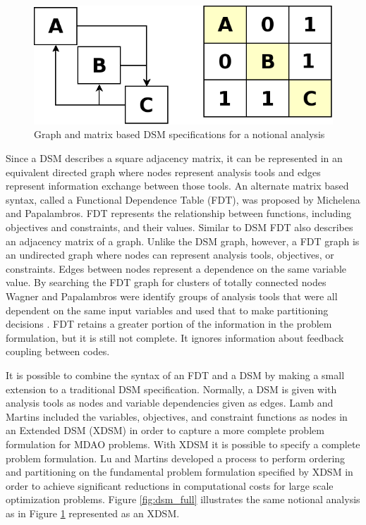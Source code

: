     \begin{figure}[!hbp]
        \begin{center}
        \includegraphics[width=.75\textwidth]{images/dsm_simple}
        \caption{Graph and matrix based DSM specifications for a notional analysis \label{fig:dsm_simple}}
        \end{center}
    \end{figure}

    Since a DSM describes a square adjacency matrix, it can be represented in an equivalent directed graph where nodes represent analysis tools and 
    edges represent information exchange between those tools. An alternate matrix based syntax, called a 
    Functional Dependence Table (FDT), was proposed by Michelena and Papalambros. 
    FDT represents the relationship between functions, including objectives and constraints, and their values\cite{Michelena1997}. Similar to DSM
    FDT also describes an adjacency matrix of a graph. Unlike the DSM graph, however, a FDT graph is an undirected 
    graph where nodes can represent analysis tools, objectives, or constraints. Edges between nodes represent a dependence on the same 
    variable value. By searching the FDT graph for clusters of totally connected nodes Wagner and Papalambros were identify groups of 
    analysis tools that were all dependent on the same input variables and used that to make partitioning decisions \cite{Wagner1993}. FDT retains 
    a greater portion of the information in the problem formulation, but it is still not complete. It ignores information about feedback coupling 
    between codes. 

    It is possible to combine the syntax of an FDT and a DSM by making a small extension to a traditional DSM specification. Normally, a DSM is given 
    with analysis tools as nodes and variable dependencies given as edges. Lamb and Martins included the variables, objectives, and constraint functions
    as nodes in an Extended DSM (XDSM)\cite{Lambe2012} in order to capture a more complete problem formulation for MDAO problems. With XDSM 
    it is possible to specify a complete problem formulation. Lu and Martins developed a process to perform ordering and partitioning on the fundamental 
    problem formulation specified by XDSM in order to achieve significant reductions in computational costs for large scale optimization problems. 
    Figure \ref{fig:dsm_full} illustrates the same notional analysis as in Figure \ref{fig:dsm_simple} represented as an XDSM.

